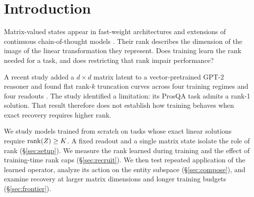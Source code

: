 \section{Introduction}
\label{sec:intro}

Matrix-valued states appear in fast-weight architectures
\citep{schlag2021linear} and extensions of continuous chain-of-thought
models \citep{hao2024coconut}. Their rank describes the dimension of the
image of the linear transformation they represent. Does training learn
the rank needed for a task, and does restricting that rank impair
performance?

A recent study added a $d \times d$ matrix latent to a vector-pretrained
GPT-2 reasoner and found flat rank-$k$ truncation curves across four
training regimes and four readouts \citep{larson2026gradient}. The study
identified a limitation: its ProsQA task admits a rank-1 solution.
That result therefore does not establish how training behaves when
exact recovery requires higher rank.

We study models trained from scratch on tasks whose exact linear
solutions require $\operatorname{rank}(Z) \geq K$. A fixed readout and a single matrix
state isolate the role of rank (\S\ref{sec:setup}). We measure the rank
learned during training and the effect of training-time rank caps
(\S\ref{sec:recruit}). We then test repeated application of the learned
operator, analyze its action on the entity subspace
(\S\ref{sec:compose}), and examine recovery at larger matrix dimensions
and longer training budgets (\S\ref{sec:frontier}).

